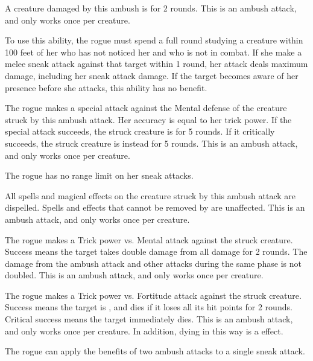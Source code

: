         A creature damaged by this ambush is \immobilized for 2 rounds.
        This is an ambush attack, and only works once per creature.

        To use this ability, the rogue must spend a full round studying a creature within 100 feet of her who has not noticed her and who is not in combat.
        If she make a melee sneak attack against that target within 1 round, her attack deals maximum damage, including her sneak attack damage.
        If the target becomes aware of her presence before she attacks, this ability has no benefit.

        The rogue makes a special attack against the Mental defense of the creature struck by this ambush attack.
        Her accuracy is equal to her trick power.
        If the special attack succeeds, the struck creature is \disoriented for 5 rounds.
        If it critically succeeds, the struck creature is instead \confused for 5 rounds.
        This is an ambush attack, and only works once per creature.

        The rogue has no range limit on her sneak attacks.

        All spells and magical effects on the creature struck by this ambush attack are dispelled.
        Spells and effects that cannot be removed by  are unaffected.
        This is an ambush attack, and only works once per creature.

        The rogue makes a Trick power vs. Mental attack against the struck creature.
        Success means the target takes double damage from all damage for 2 rounds.
        The damage from the ambush attack and other attacks during the same phase is not doubled.
        This is an ambush attack, and only works once per creature.

        The rogue makes a Trick power vs. Fortitude attack against the struck creature.
        Success means the target is \staggered, and dies if it loses all its hit points for 2 rounds.
        Critical success means the target immediately dies.
        This is an ambush attack, and only works once per creature.
        In addition, dying in this way is a  effect.

        The rogue can apply the benefits of two ambush attacks to a single sneak attack.

